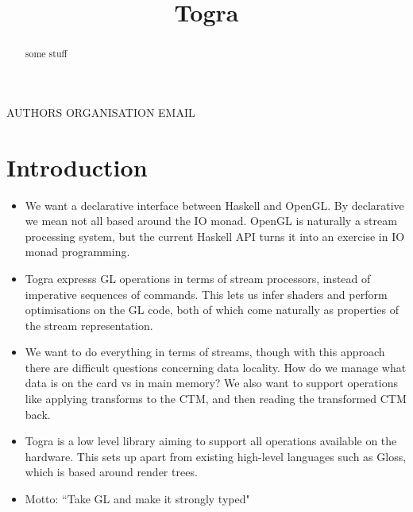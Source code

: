 \documentclass[preprint]{sigplanconf}
\begin{document}

\title	{Togra}
\authorinfo
	{AUTHORS}
	{ORGANISATION}
	{EMAIL}
\maketitle

\makeatactive


\begin{abstract}
some stuff

\end{abstract}


\section{Introduction}
\begin{itemize}
\item	We want a declarative interface between Haskell and OpenGL. By declarative we mean not all based around the IO monad. OpenGL is naturally a stream processing system, but the current Haskell API turns it into an exercise in IO monad programming.

\item	Togra expresss GL operations in terms of stream processors, instead of imperative sequences of commands. This lets us infer shaders and perform optimisations on the GL code, both of which come naturally as properties of the stream representation.

\item	We want to do everything in terms of streams, though with this approach there are difficult questions concerning data locality. How do we manage what data is on the card vs in main memory? We also want to support operations like applying transforms to the CTM, and then reading the transformed CTM back.

\item	Togra is a low level library aiming to support all operations available on the hardware. This sets up apart from existing high-level languages such as Gloss, which is based around render trees. 

\item	Motto: ``Take GL and make it strongly typed"


\end{itemize}
\end{document}
